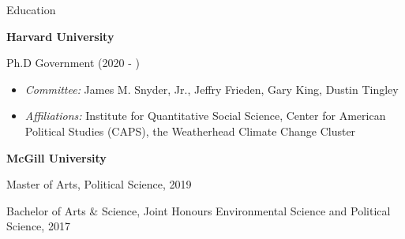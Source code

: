 \documentclass{resume}
\providecommand{\NewEntry}[2]{
  \textbf{#1} \hfill #2\\
}
\begin{document}

\begin{rSection}{\Large E\MakeLowercase{ducation}}

{\bf Harvard University} \hfill {\em } 

Ph.D Government (2020 - ) \hfill { } 

{\vspace{-\baselineskip}
\begin{itemize}[topsep=0pt]
\medskip
    \item[] \textit{Committee:} James M. Snyder, Jr., Jeffry Frieden, Gary King, Dustin Tingley
   \item[] \textit{Affiliations:} Institute for Quantitative Social Science, Center for American Political Studies (CAPS), the Weatherhead Climate Change Cluster
\end{itemize}}

\bigskip

{\bf McGill University} \hfill {\em } 

Master of Arts, Political Science, 2019 \hfill { } 

\smallskip

Bachelor of Arts \& Science, Joint Honours Environmental Science and Political Science, 2017

\end{rSection}

\bigskip
\end{document}
